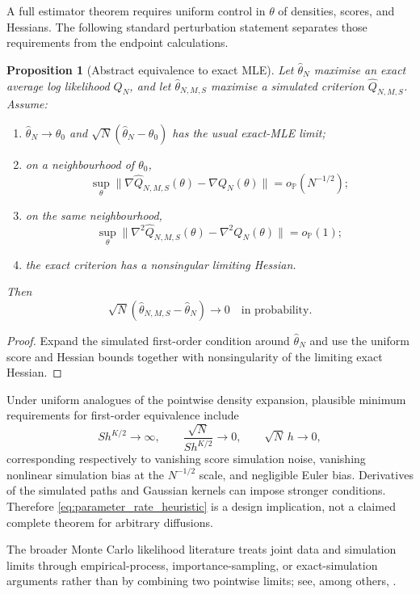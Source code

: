 \documentclass[11pt]{article}
\newtheorem{proposition}{Proposition}
\theoremstyle{definition}
\newcommand{\Pp}{\mathbb{P}}
\newcommand{\thetao}{\theta_0}
\begin{document}
A full estimator theorem requires uniform control in $\theta$ of densities, scores, and Hessians. The following standard perturbation statement separates those requirements from the endpoint calculations.

\begin{proposition}[Abstract equivalence to exact MLE]\label{prop:m_estimator}
Let $\widehat\theta_N$ maximise an exact average log likelihood $Q_N$, and let $\widehat\theta_{N,M,S}$ maximise a simulated criterion $\widehat Q_{N,M,S}$. Assume:
\begin{enumerate}[label=(\roman*)]
\item $\widehat\theta_N\to\thetao$ and $\sqrt N(\widehat\theta_N-\thetao)$ has the usual exact-MLE limit;
\item on a neighbourhood of $\thetao$,
\[
\sup_\theta
\|\nabla\widehat Q_{N,M,S}(\theta)-\nabla Q_N(\theta)\|
=o_{\Pp}(N^{-1/2});
\]
\item on the same neighbourhood,
\[
\sup_\theta
\|\nabla^2\widehat Q_{N,M,S}(\theta)-\nabla^2Q_N(\theta)\|
=o_{\Pp}(1);
\]
\item the exact criterion has a nonsingular limiting Hessian.
\end{enumerate}
Then
\[
\sqrt N(\widehat\theta_{N,M,S}-\widehat\theta_N)\to0
\quad\text{in probability}.
\]
\end{proposition}

\begin{proof}
Expand the simulated first-order condition around $\widehat\theta_N$ and use the uniform score and Hessian bounds together with nonsingularity of the limiting exact Hessian.
\end{proof}

Under uniform analogues of the pointwise density expansion, plausible minimum requirements for first-order equivalence include
\begin{equation}\label{eq:parameter_rate_heuristic}
S h^{K/2}\to\infty,
\qquad
\frac{\sqrt N}{S h^{K/2}}\to0,
\qquad
\sqrt N\,h\to0,
\end{equation}
corresponding respectively to vanishing score simulation noise, vanishing nonlinear simulation bias at the $N^{-1/2}$ scale, and negligible Euler bias. Derivatives of the simulated paths and Gaussian kernels can impose stronger conditions. Therefore \eqref{eq:parameter_rate_heuristic} is a design implication, not a claimed complete theorem for arbitrary diffusions.

The broader Monte Carlo likelihood literature treats joint data and simulation limits through empirical-process, importance-sampling, or exact-simulation arguments rather than by combining two pointwise limits; see, among others, \citet{Lee1995,SungGeyer2007,BeskosEtAl2009,MiasojedowEtAl2016}.
\end{document}
